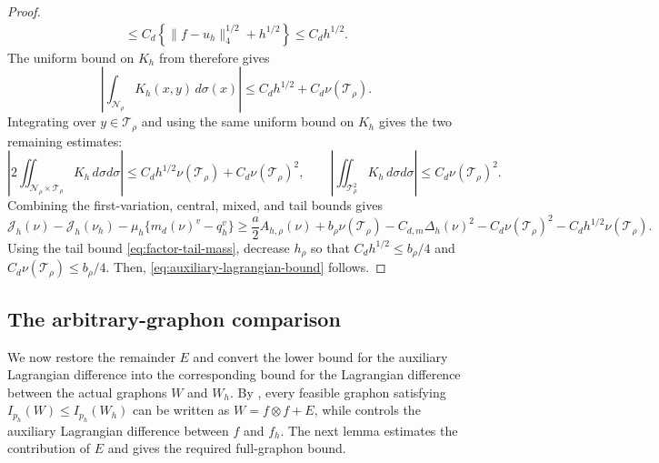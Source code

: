 \begin{proof}
\begin{equation*}
\begin{aligned}
  \le C_d\left\{\|f-u_h\|_4^{1/2}+h^{1/2}\right\}
  \le C_dh^{1/2}.
\end{aligned}
\end{equation*}
The uniform bound on $K_h$ from
 therefore gives
\[
  \left|\int_{\mathcal N_\rho}K_h(x,y)\,d\sigma(x)\right|
  \le C_dh^{1/2}+C_d\nu(\mathcal T_\rho).
\]
Integrating over $y\in\mathcal T_\rho$ and using the same uniform bound on
$K_h$ gives the two remaining estimates:
\[
  \left|2\iint_{\mathcal N_\rho\times\mathcal T_\rho} K_h\,d\sigma d\sigma\right|
  \le C_dh^{1/2}\nu(\mathcal T_\rho)+C_d\nu(\mathcal T_\rho)^2,
  \qquad
  \left|\iint_{\mathcal T_\rho^2}K_h\,d\sigma d\sigma\right|
  \le C_d\nu(\mathcal T_\rho)^2.
\]
Combining the first-variation, central, mixed, and tail bounds gives
\begin{equation*}
  \mathcal J_h(\nu)-\mathcal J_h(\nu_h)
    -\mu_h\{m_d(\nu)^v-q_h^v\}
  \ge\frac{a}{2}A_{h,\rho}(\nu)+b_\rho\nu(\mathcal T_\rho)
  -C_{d,m}\Delta_h(\nu)^2-C_d\nu(\mathcal T_\rho)^2
    -C_dh^{1/2}\nu(\mathcal T_\rho).
\end{equation*}
Using the tail bound \eqref{eq:factor-tail-mass}, decrease $h_\rho$ so that
$C_dh^{1/2}\le b_\rho/4$ and $C_d\nu(\mathcal T_\rho)\le b_\rho/4$.
Then, \eqref{eq:auxiliary-lagrangian-bound} follows.
\end{proof}

\subsection{The arbitrary-graphon comparison}
\label{sec:graphon-comparison}

We now restore the remainder $E$ and convert the lower bound for the auxiliary
Lagrangian difference into the corresponding bound for the Lagrangian
difference between the actual graphons $W$ and $W_h$.
By , every feasible graphon satisfying
$I_{p_h}(W)\le I_{p_h}(W_h)$ can be written as $W=f\otimes f+E$, while
 controls the auxiliary Lagrangian
difference between $f$ and $f_h$.  The next lemma estimates the contribution
of $E$ and gives the required full-graphon bound.


